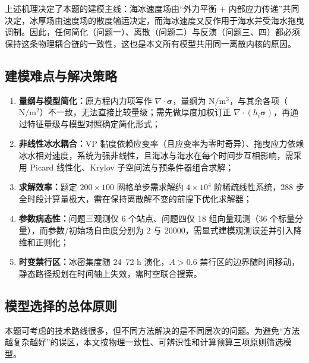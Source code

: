 \documentclass[UTF8]{ctexart}
\newcommand{\vect}[1]{\boldsymbol{#1}}
\begin{document}
上述机理决定了本题的建模主线：海冰速度场由“外力平衡 + 内部应力传递”共同决定，冰厚场由速度场的散度输运决定，而海冰速度又反作用于海水并受海水拖曳调制。因此，任何简化（问题一）、离散（问题二）与反演（问题三、四）都必须保持这条物理耦合链的一致性，这也是本文所有模型共用同一离散内核的原因。

\subsection{建模难点与解决策略}

\begin{enumerate}
\item \textbf{量纲与模型简化：}原方程内力项写作 $\nabla\cdot\vect\sigma$，量纲为 $\mathrm{N/m^3}$，与其余各项（$\mathrm{N/m^2}$）不一致，无法直接比较量级；需先做厚度加权订正 $\nabla\cdot(h_i\vect\sigma)$，再通过特征量级与模型对照确定简化形式；
\item \textbf{非线性冰水耦合：}VP 黏度依赖应变率（且应变率为零时奇异）、拖曳应力依赖冰水相对速度，系统为强非线性，且海冰与海水在每个时间步互相影响，需采用 Picard 线性化、Krylov 子空间法与预条件器组合求解；
\item \textbf{求解效率：}题定 $200\times100$ 网格单步需求解约 $4\times10^4$ 阶稀疏线性系统，288 步全时段计算量极大，需在保持离散解不变的前提下优化求解器；
\item \textbf{参数病态性：}问题三观测仅 6 个站点、问题四仅 18 组向量观测（36 个标量分量），而参数/初始场自由度分别为 2 与 20000，需显式建模观测误差并引入降维和正则化；
\item \textbf{时变禁行区：}冰密集度随 24--72 h 演化，$A>0.6$ 禁行区的边界随时间移动，静态路径规划在时间轴上失效，需时空联合搜索。
\end{enumerate}

\subsection{模型选择的总体原则}

本题可考虑的技术路线很多，但不同方法解决的是不同层次的问题。为避免“方法越复杂越好”的误区，本文按物理一致性、可辨识性和计算预算三项原则筛选模型。
\end{document}
